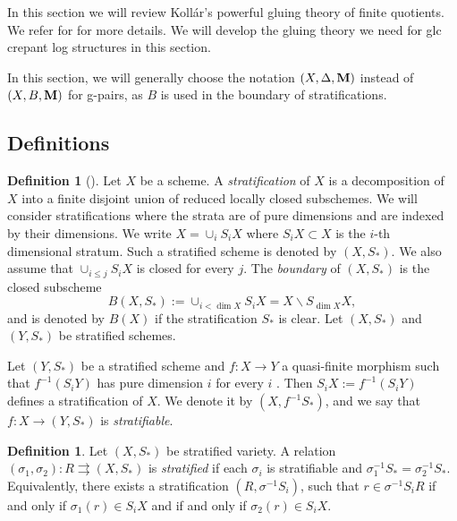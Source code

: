 \documentclass[11pt]{amsart}
\numberwithin{equation}{section}
\newcommand{\Mm}{{\bf{M}}}
\theoremstyle{definition}
\newtheorem{defn}[thm]{Definition}
\theoremstyle{definition}
\theoremstyle{definition}
\begin{document}
In this section we will review Koll\'ar’s powerful gluing theory of finite quotients. We refer for \cite[Section 5, Section 9]{Kol13} for more details. We will develop the gluing theory we need for glc crepant log structures in this section.


In this section, we will generally choose the notation $(X,\Delta,\Mm)$ instead of $(X,B,\Mm)$ for g-pairs, as $B$ is used in the boundary of stratifications.

\subsection{Definitions}

\begin{defn}[{\cite[Definition 9.15]{Kol13}}] 
Let $X$ be a scheme. A {\it stratification} of $X$ is a decomposition of $X$ into a finite disjoint union of reduced locally closed subschemes. We will consider stratifications where the strata are of pure dimensions
and are indexed by their dimensions. We write $X=\cup_{i}S_iX$ where $S_iX\subset X$ is the $i$-th
dimensional stratum. Such a stratified scheme is denoted by $(X,S_*)$. We also
assume that $\cup_{i\le j}S_iX$ is closed for every $j$. The {\it boundary} of $(X,S_*)$ is the closed subscheme
$$
B(X,S_*):=\cup_{i<\dim X}S_iX=X\backslash S_{\dim X}X,
$$
and is denoted by $B(X)$ if the stratification $S_*$ is clear. Let $(X, S_*)$ and $(Y, S_*)$ be stratified schemes. 


Let $(Y, S_*)$ be a stratified scheme and $f:X\to Y$ a quasi-finite morphism such that $f^{-1} (S_iY)$ has pure dimension $i$ for every $i$ . Then $S_iX:=f^{-1}(S_iY)$ defines a stratification of $X$. We denote it by $(X,f^{-1}S_*)$, and we say that $f:X\to(Y,S_*)$ is \emph{stratifiable}.
\end{defn}

\begin{defn}
Let $(X, S_*)$ be stratified variety. A relation $(\sigma_1,\sigma_2): R\rightrightarrows (X,S_*)$ is {\it stratified} if each $\sigma_i$ is stratifiable and $\sigma_1^{-1}S_*=\sigma_2^{-1}S_*$. Equivalently,
there exists a stratification $(R,\sigma^{-1}S_i)$, such that $r\in\sigma^{-1}S_iR$ if and only if $\sigma_1(r)\in S_iX$ and if and only if $\sigma_2(r)\in S_iX$.
\end{defn}
\end{document}
